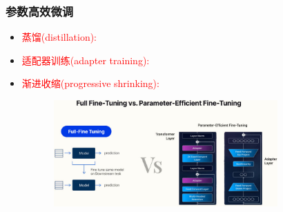 \begin{frame}
    \frametitle{参数高效微调}
    \begin{itemize}
	    \item \textcolor{red}{蒸馏\textrm{(distillation):}}\\
		    {\fontsize{7.2pt}{6.2pt}\selectfont{该方法涉及训练一个较小的模型来模仿一个较大的预训练模型的行为}}%
	    \item  \textcolor{red}{适配器训练\textrm{(adapter training):}}\\
		    {\fontsize{7.2pt}{6.2pt}\selectfont{适配器是添加到预训练模型中的小型神经网络，用于特定任务的微调}}%
	    \item \textcolor{red}{渐进收缩\textrm{(progressive shrinking):}}\\
		    {\fontsize{7.2pt}{6.2pt}}%
    \end{itemize}
\begin{figure}[h!]
\vspace*{-0.08in}
\centering
\includegraphics[height=1.6in, width=4.0in, viewport=0 0 225 90,clip]{Figures/Full-Fine-Tuning-vs-Parameter-Efficient-Fine-Tuning.jpg}
\label{Full-Fine-Tuning-vs-Parameter-Efficient-Fine-Tuning}
\end{figure}
\end{frame}


